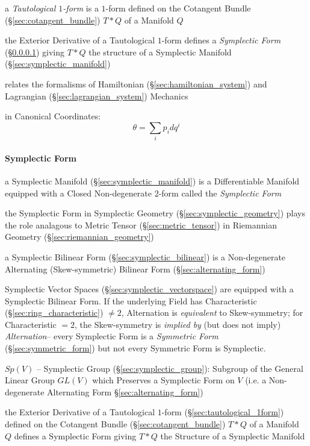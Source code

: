 a \emph{Tautological $1$-form} is a $1$-form defined on the Cotangent Bundle
(\S\ref{sec:cotangent_bundle}) $T * Q$ of a Manifold $Q$

the Exterior Derivative of a Tautological $1$-form defines a \emph{Symplectic
  Form} (\S\ref{sec:symplectic_form}) giving $T * Q$ the structure of a
Symplectic Manifold (\S\ref{sec:symplectic_manifold})

relates the formalisms of Hamiltonian (\S\ref{sec:hamiltonian_system}) and
Lagrangian (\S\ref{sec:lagrangian_system}) Mechanics

in Canonical Coordinates:
\[
  \theta = \sum_i p_i dq^i
\]



\paragraph{Symplectic Form}\label{sec:symplectic_form}\hfill


a Symplectic Manifold (\S\ref{sec:symplectic_manifold}) is a Differentiable
Manifold equipped with a Closed Non-degenerate $2$-form called the
\emph{Symplectic Form}

the Symplectic Form in Symplectic Geometry (\S\ref{sec:symplectic_geometry})
plays the role analagous to Metric Tensor (\S\ref{sec:metric_tensor}) in
Riemannian Geometry (\S\ref{sec:riemannian_geometry})

a Symplectic Bilinear Form (\S\ref{sec:symplectic_bilinear}) is a
Non-degenerate Alternating (Skew-symmetric) Bilinear Form
(\S\ref{sec:alternating_form})

Symplectic Vector Spaces (\S\ref{sec:symplectic_vectorspace}) are equipped with
a Symplectic Bilinear Form. If the underlying Field has Characteristic
(\S\ref{sec:ring_characteristic}) $\neq 2$, Alternation is \emph{equivalent} to
Skew-symmetry; for Characteristic $=2$, the Skew-symmetry is \emph{implied by}
(but does not imply) \emph{Alternation}-- every Symplectic Form is a
\emph{Symmetric Form} (\S\ref{sec:symmetric_form}) but not every Symmetric Form
is Symplectic.

$Sp(V)$ -- Symplectic Group (\S\ref{sec:symplectic_group}): Subgroup of the
General Linear Group $GL(V)$ which Preserves a Symplectic Form on $V$ (i.e. a
Non-degenerate Alternating Form \S\ref{sec:alternating_form})

the Exterior Derivative of a Tautological $1$-form
(\S\ref{sec:tautological_1form}) defined on the Cotangent Bundle
(\S\ref{sec:cotangent_bundle}) $T * Q$ of a Manifold $Q$ defines a Symplectic
Form giving $T * Q$ the Structure of a Symplectic Manifold

